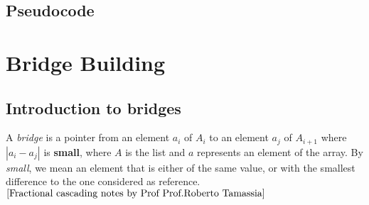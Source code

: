 \documentclass[11pt]{article}
\begin{document}
\subsection{Pseudocode}
\begin{tcolorbox}[blanker,width=(\linewidth-3.5cm)]
\begin{algorithm}[H]
    \SetAlgoLined
    
    
    {
        
    }
    
    
    

\end{algorithm}
\end{tcolorbox}



\section{Bridge Building}
\subsection{Introduction to bridges}
A \textit{bridge} is a pointer from an element $a_i$ of $A_i$ to an element $a_j$ of $A_{i+1}$ where  $|a_i-a_j|$ is \textbf{small}, where $A$ is the list and $a$ represents an element of the array. By \textit{small}, we mean an element that is either of the same value, or with the smallest difference to the one considered as reference.$^{\cite{Fractional cascading notes by Prof Prof.Roberto Tamassia}}$ \\ 
\end{document}
